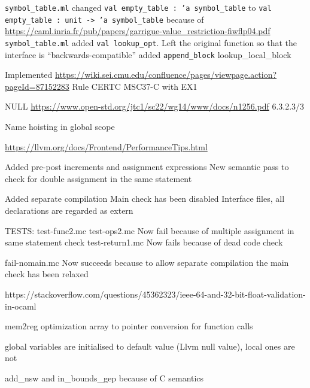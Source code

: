 
\texttt{symbol_table.ml} changed \texttt{val empty_table : 'a symbol_table} to \texttt{val empty_table : unit -> 'a symbol_table} because of \url{https://caml.inria.fr/pub/papers/garrigue-value_restriction-fiwflp04.pdf}
\texttt{symbol_table.ml} added \texttt{val lookup_opt}. Left the original function so that the interface is ``backwards-compatible''
added \texttt{append_block}
lookup_local_block

Implemented \url{https://wiki.sei.cmu.edu/confluence/pages/viewpage.action?pageId=87152283} Rule CERTC MSC37-C with EX1

NULL \url{https://www.open-std.org/jtc1/sc22/wg14/www/docs/n1256.pdf} 6.3.2.3/3

Name hoisting in global scope

\url{https://llvm.org/docs/Frontend/PerformanceTips.html}


Added pre-post increments and assignment expressions
New semantic pass to check for double assignment in the same statement

Added separate compilation
Main check has been disabled
Interface files, all declarations are regarded as extern



TESTS:
    test-func2.mc
    test-ops2.mc
        Now fail because of multiple assignment in same statement check
    test-return1.mc
        Now fails because of dead code check
    
    fail-nomain.mc
        Now succeeds because to allow separate compilation the main check has been relaxed



        https://stackoverflow.com/questions/45362323/ieee-64-and-32-bit-float-validation-in-ocaml

mem2reg optimization
array to pointer conversion for function calls

global variables are initialised to default value (Llvm null value), local ones are not

add_nsw and in_bounds_gep because of C semantics